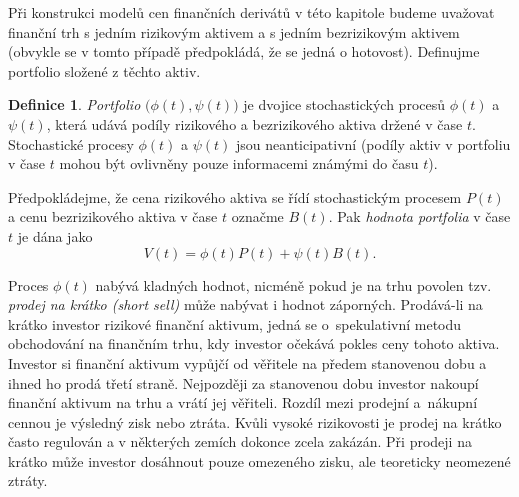 \documentclass[a4paper,12pt]{report}
\theoremstyle{definition} \newtheorem{definice}[veta]{Definice}
\theoremstyle{remark}
\begin{document}
Při konstrukci modelů cen finančních derivátů v této kapitole budeme uvažovat finanční trh s jedním rizikovým aktivem a s jedním bezrizikovým aktivem (obvykle se v tomto případě předpokládá, že se jedná o hotovost).
Definujme portfolio složené z těchto aktiv.
\begin{definice}
\textit{Portfolio} $\big(\phi(t),\psi(t)\big)$ je dvojice stochastických procesů $\phi(t)$ a~$\psi(t)$, která udává podíly rizikového a bezrizikového aktiva držené v čase $t$.
Stochastické procesy  $\phi(t)$ a $\psi(t)$ jsou neanticipativní (podíly aktiv v portfoliu v čase $t$ mohou být ovlivněny pouze informacemi známými do času $t$).

Předpokládejme, že cena rizikového aktiva se řídí stochastickým procesem $P(t)$ a cenu bezrizikového aktiva v čase $t$ označme $B(t)$.
Pak \textit{hodnota portfolia} v čase $t$ je dána jako
\begin{equation}\label{hodnota_portfolia}
V(t)=\phi(t)P(t)+\psi(t)B(t).
\end{equation}
\end{definice}

Proces $\phi(t)$  nabývá kladných hodnot, nicméně pokud je na trhu povolen tzv. \textit{prodej na krátko (short sell)} může nabývat i hodnot záporných.
Prodává-li na krátko investor rizikové finanční aktivum, jedná se o~spekulativní metodu obchodování na finančním trhu, kdy investor očekává pokles ceny tohoto aktiva.
Investor si finanční aktivum vypůjčí od věřitele na předem stanovenou dobu a ihned ho prodá třetí straně.
Nejpozději za stanovenou dobu investor nakoupí finanční aktivum na trhu a vrátí jej věřiteli.
Rozdíl mezi prodejní a~nákupní cennou je výsledný zisk nebo ztráta.
Kvůli vysoké rizikovosti je prodej na krátko často regulován a v některých zemích dokonce zcela zakázán.
Při prodeji na krátko může investor dosáhnout pouze omezeného zisku, ale teoreticky neomezené ztráty.


\end{document}
